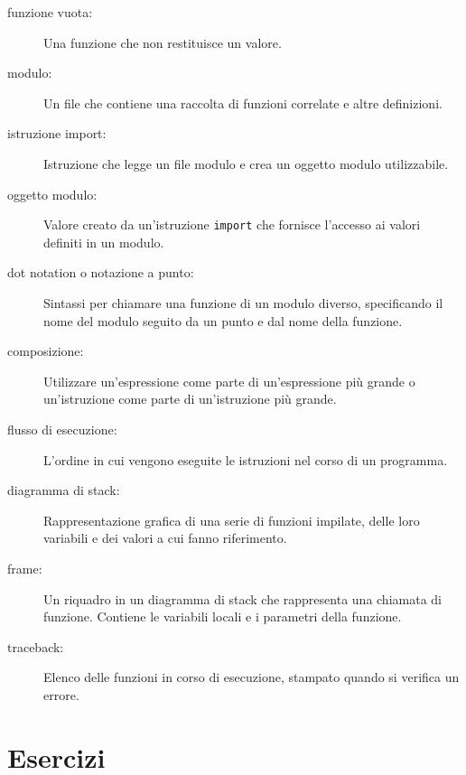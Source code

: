 \documentclass[10pt]{book}
\begin{document}
\begin{description}
\item[funzione vuota:] Una funzione che non restituisce un valore.

\item[modulo:] Un file che contiene una raccolta di funzioni correlate e altre definizioni.

\item[istruzione import:] Istruzione che legge un file modulo e crea un oggetto modulo utilizzabile.

\item[oggetto modulo:] Valore creato da un'istruzione {\tt import} che fornisce l'accesso ai valori definiti in un modulo.

\item[dot notation o notazione a punto:]  Sintassi per chiamare una funzione di un modulo diverso, specificando il nome del modulo seguito da un punto e dal nome della funzione.

\item[composizione:] Utilizzare un'espressione come parte di un'espressione più grande o un'istruzione come parte di un'istruzione più grande.

\item[flusso di esecuzione:]  L'ordine in cui vengono eseguite le istruzioni nel corso di un programma.

\item[diagramma di stack:]  Rappresentazione grafica di una serie di funzioni impilate, delle loro variabili e dei valori a cui fanno riferimento.

\item[frame:]  Un riquadro in un diagramma di stack che rappresenta una chiamata di funzione. Contiene le variabili locali e i parametri della funzione.

\item[traceback:]  Elenco delle funzioni in corso di esecuzione, stampato quando si verifica un errore.


\end{description}


\section{Esercizi}
\end{document}
